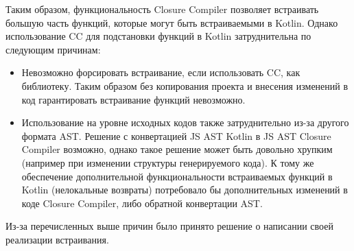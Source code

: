 Таким образом, функциональность Closure Compiler позволяет
встраивать большую часть функций, которые могут быть встраиваемыми
в Kotlin. Однако использование CC для подстановки функций в Kotlin
затруднительна по следующим причинам:
\begin{itemize}
  \item Невозможно форсировать встраивание, если использовать
  CC, как библиотеку. Таким образом без копирования проекта
  и внесения изменений в код гарантировать встраивание функций
  невозможно.
  \item Использование на уровне исходных кодов также затруднительно
  из-за другого формата AST. Решение с конвертацией JS AST Kotlin в JS AST Closure
  Compiler возможно, однако такое решение может быть довольно хрупким
   (например при изменении структуры генерируемого кода). К тому же
   обеспечение дополнительной функциональности встраиваемых функций в Kotlin
   (нелокальные возвраты) потребовало бы дополнительных
   изменений в коде Closure Compiler, либо обратной конвертации AST.
\end{itemize}

Из-за перечисленных выше причин было принято решение о
написании своей реализации встраивания.
